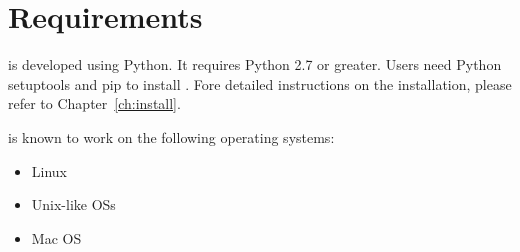 \section{Requirements}
\systemname is developed using Python. It requires Python 2.7 or greater.
Users need Python setuptools and pip to install \systemname. Fore detailed
instructions on the installation, please refer to Chapter~\ref{ch:install}.

\systemname is known to work on the following operating systems:
\begin{itemize}
\item Linux
\item Unix-like OSs
\item Mac OS
\end{itemize}

